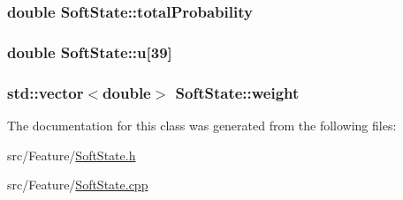 \hypertarget{class_soft_state_ace0f0548a8ece0e43299f7291c9155e2}{
\subsubsection[{total\+Probability}]{\setlength{\rightskip}{0pt plus 5cm}double Soft\+State\+::total\+Probability\hspace{0.3cm}{\ttfamily [private]}}}\label{class_soft_state_ace0f0548a8ece0e43299f7291c9155e2}
\hypertarget{class_soft_state_a7ac1e0c5327ce8dddd74bd649ed615e0}{
\subsubsection[{u}]{\setlength{\rightskip}{0pt plus 5cm}double Soft\+State\+::u\mbox{[}39\mbox{]}\hspace{0.3cm}{\ttfamily [private]}}}\label{class_soft_state_a7ac1e0c5327ce8dddd74bd649ed615e0}
\hypertarget{class_soft_state_a7b4ebb0c683371ead7d0531acb7e0c5a}{
\subsubsection[{weight}]{\setlength{\rightskip}{0pt plus 5cm}std\+::vector$<$double$>$ Soft\+State\+::weight\hspace{0.3cm}{\ttfamily [private]}}}\label{class_soft_state_a7b4ebb0c683371ead7d0531acb7e0c5a}


The documentation for this class was generated from the following files\+:\begin{DoxyCompactItemize}
\item 
src/\+Feature/\hyperlink{_soft_state_8h}{Soft\+State.\+h}\item 
src/\+Feature/\hyperlink{_soft_state_8cpp}{Soft\+State.\+cpp}\end{DoxyCompactItemize}
